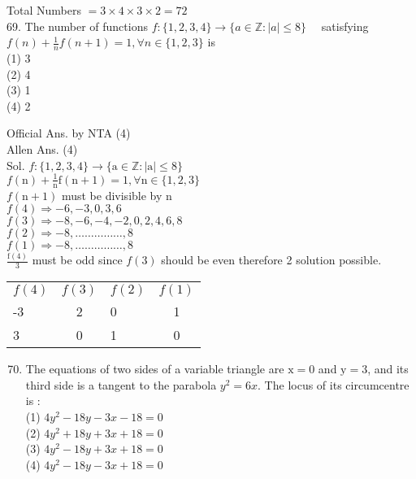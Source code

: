 \documentclass[10pt]{article}
\begin{document}
Total Numbers \(=3 \times 4 \times 3 \times 2=72\)\\
69. The number of functions \(f:\{1,2,3,4\} \rightarrow\{a \in \mathbb{Z}:|a| \leq 8\} \quad\) satisfying \(f(n)+ \frac{1}{n} f(n+1)=1, \forall n \in\{1,2,3\}\) is\\
(1) 3\\
(2) 4\\
(3) 1\\
(4) 2

Official Ans. by NTA (4)\\
Allen Ans. (4)\\
Sol. \(f:\{1,2,3,4\} \rightarrow\{\mathrm{a} \in \mathbb{Z}:|\mathrm{a}| \leq 8\}\)\\
\(f(\mathrm{n})+\frac{1}{\mathrm{n}} \mathrm{f}(\mathrm{n}+1)=1, \forall \mathrm{n} \in\{1,2,3\}\)\\
\(f(\mathrm{n}+1)\) must be divisible by n\\
\(f(4) \Rightarrow-6,-3,0,3,6\)\\
\(f(3) \Rightarrow-8,-6,-4,-2,0,2,4,6,8\)\\
\(f(2) \Rightarrow-8, \ldots \ldots \ldots \ldots \ldots, 8\)\\
\(f(1) \Rightarrow-8, \ldots \ldots \ldots \ldots \ldots, 8\)\\
\(\frac{\mathrm{f}(4)}{3}\) must be odd since \(f(3)\) should be even therefore 2 solution possible.

\begin{center}
\begin{tabular}{lclc}
\(f(4)\) & \(f(3)\) & \(f(2)\) & \(f(1)\) \\
-3 & 2 & 0 & 1 \\
3 & 0 & 1 & 0 \\
\end{tabular}
\end{center}

\begin{enumerate}
  \setcounter{enumi}{69}
  \item The equations of two sides of a variable triangle are \(\mathrm{x}=0\) and \(\mathrm{y}=3\), and its third side is a tangent to the parabola \(y^{2}=6 x\). The locus of its circumcentre is :\\
(1) \(4 y^{2}-18 y-3 x-18=0\)\\
(2) \(4 y^{2}+18 y+3 x+18=0\)\\
(3) \(4 y^{2}-18 y+3 x+18=0\)\\
(4) \(4 y^{2}-18 y-3 x+18=0\)
\end{enumerate}
\end{document}
